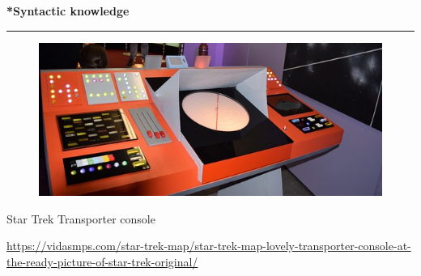 \documentclass[pdf]{beamer}
\begin{document}
\begin{frame}
\vspace{8mm}
\textcolor{myBlue}{\textbf{\Large{*Syntactic knowledge}}}

\textcolor{red}{\rule{10cm}{1mm}}

  \begin{figure}
  \centering
  	\includegraphics[scale=0.5]{star-trek-map-lovely-transporter-console-at-the-ready-picture-of-star-trek-original.jpg} 
  \end{figure}

Star Trek Transporter console

\url{https://vidasmps.com/star-trek-map/star-trek-map-lovely-transporter-console-at-the-ready-picture-of-star-trek-original/}

\end{frame}
\end{document}

